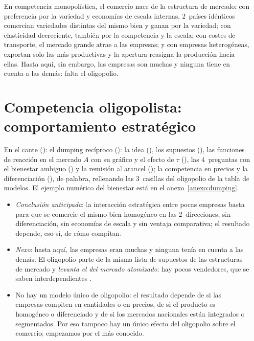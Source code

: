 \documentclass[11pt]{article}
\begin{document}
\begin{ideaclave}
En competencia monopolística, el comercio nace de la estructura de mercado: con preferencia por la variedad y economías de escala internas, 2~países idénticos comercian variedades distintas del mismo bien y ganan por la variedad; con elasticidad decreciente, también por la competencia y la escala; con costes de transporte, el mercado grande atrae a las empresas; y con empresas heterogéneas, exportan solo las más productivas y la apertura reasigna la producción hacia ellas. Hasta aquí, sin embargo, las empresas son muchas y ninguna tiene en cuenta a las demás: falta el oligopolio.
\end{ideaclave}

\section{Competencia oligopolista: comportamiento estratégico}\label{sec:oligopolio}

\begin{notaopositor}
En el cante (): el dumping recíproco (): la idea (), los supuestos (), las funciones de reacción en el mercado $A$ con su gráfico y el efecto de $\tau$ (), las 4~preguntas con el bienestar ambiguo () y la remisión al arancel (); la competencia en precios y la diferenciación (), de palabra, rellenando las 3~casillas del oligopolio de la tabla de modelos. El ejemplo numérico del bienestar está en el anexo~\ref{anexo:dumping}.
\end{notaopositor}

\begin{itemize}
\item \emph{Conclusión anticipada}: la interacción estratégica entre pocas empresas basta para que se comercie el mismo bien homogéneo en las 2~direcciones, sin diferenciación, sin economías de escala y sin ventaja comparativa; el resultado depende, eso sí, de cómo compitan.
\item \emph{Nexo}: hasta aquí, las empresas eran muchas y ninguna tenía en cuenta a las demás. El oligopolio parte de la misma lista de supuestos de las estructuras de mercado y \emph{levanta el del mercado atomizado}: hay pocos vendedores, que se saben interdependientes .
\item No hay un modelo único de oligopolio: el resultado depende de si las empresas compiten en cantidades o en precios, de si el producto es homogéneo o diferenciado y de si los mercados nacionales están integrados o segmentados. Por eso tampoco hay un único efecto del oligopolio sobre el comercio; empezamos por el más conocido.
\end{itemize}
\end{document}
